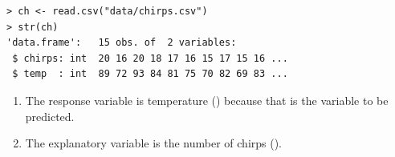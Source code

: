 \documentclass[10pt,openany]{book}\usepackage[]{graphicx}\usepackage[]{color}
\makeatletter
\newenvironment{kframe}{%
 \def\at@end@of@kframe{}%
 \ifinner\ifhmode%
  \def\at@end@of@kframe{\end{minipage}}%
  \begin{minipage}{\columnwidth}%
 \fi\fi%
 \def\FrameCommand##1{\hskip\@totalleftmargin \hskip-\fboxsep
 \colorbox{shadecolor}{##1}\hskip-\fboxsep
     \hskip-\linewidth \hskip-\@totalleftmargin \hskip\columnwidth}%
 \MakeFramed {\advance\hsize-\width
   \@totalleftmargin\z@ \linewidth\hsize
   \@setminipage}}%
 {\par\unskip\endMakeFramed%
 \at@end@of@kframe}
\newenvironment{knitrout}{}{} %
\makeatother
\begin{document}
\begin{itemize}
\begin{knitrout}
\color{fgcolor}\begin{kframe}
\begin{verbatim}
> ch <- read.csv("data/chirps.csv")
> str(ch)
'data.frame':	15 obs. of  2 variables:
 $ chirps: int  20 16 20 18 17 16 15 17 15 16 ...
 $ temp  : int  89 72 93 84 81 75 70 82 69 83 ...
\end{verbatim}
\end{kframe}
\end{knitrout}
    \begin{enumerate}
      \item The response variable is temperature () because that is the variable to be predicted.
      \item The explanatory variable is the number of chirps ().


\end{enumerate}
\end{itemize}
\end{document}
